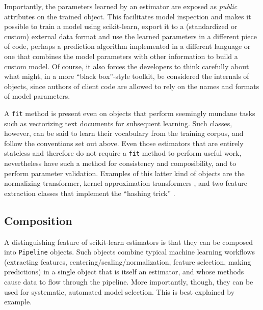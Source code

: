 \documentclass{llncs}
\begin{document}
Importantly, the parameters learned by an estimator
are exposed as \textit{public} attributes on the trained object.
This facilitates model inspection
and makes it possible to train a model using scikit-learn,
export it to a (standardized or custom) external data format
and use the learned parameters in a different piece of code,
perhaps a prediction algorithm implemented in a different language
or one that combines the model parameters with other information
to build a custom model.
Of course, it also forces the developers to think carefully
about what might, in a more ``black box''-style toolkit,
be considered the internals of objects,
since authors of client code are allowed to rely
on the names and formats of model parameters.

A \texttt{fit} method is present even on objects
that perform seemingly mundane tasks such as vectorizing text documents
for subsequent learning.
Such classes, however, can be said to learn their vocabulary
from the training corpus,
and follow the conventions set out above.
Even those estimators that are entirely stateless and therefore
do not require a \texttt{fit} method to perform useful work,
nevertheless have such a method for consistency and composibility,
and to perform parameter validation.
Examples of this latter kind of objects are the normalizing transformer,
kernel approximation transformers
\citep{rahimi2007random, li2010random, vedaldi2010efficient},
and two feature extraction classes that implement the ``hashing trick''
\citep{weinberger2009}.

\subsection{Composition}

A distinguishing feature of scikit-learn estimators
is that they can be composed into \texttt{Pipeline} objects.
Such objects combine typical machine learning workflows
(extracting features, centering/scaling/normalization,
feature selection, making predictions)
in a single object that is itself an estimator,
and whose methods cause data to flow through the pipeline.
More importantly, though, they can be used for
systematic, automated model selection.
This is best explained by example.
\end{document}
